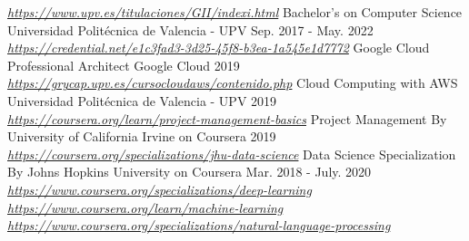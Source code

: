 

\begin{cventries}
  \cvent
    {\href{https://www.upv.es/titulaciones/GII/indexi.html}{\textit{https://www.upv.es/titulaciones/GII/indexi.html}}} %
    {Bachelor's on Computer Science} %
    {Universidad Politécnica de Valencia  - UPV} %
    {Sep. 2017 - May. 2022} %
  \cvent
    {\href{https://credential.net/e1c3fad3-3d25-45f8-b3ea-1a545e1d7772}{\textit{https://credential.net/e1c3fad3-3d25-45f8-b3ea-1a545e1d7772}}} %
    {Google Cloud Professional Architect} %
    {Google Cloud} %
    {2019} %
  \cvent
    {\href{https://grycap.upv.es/cursocloudaws/contenido.php}{\textit{https://grycap.upv.es/cursocloudaws/contenido.php}}} %
    {Cloud Computing with AWS} %
    {Universidad Politécnica de Valencia  - UPV} %
    {2019} %
  \cvent
    {\href{https://coursera.org/learn/project-management-basics}{\textit{https://coursera.org/learn/project-management-basics}}} %
    {Project Management} %
    {By University of California Irvine on Coursera} %
    {2019} %
  \cvent
    {\href{https://coursera.org/specializations/jhu-data-science}{\textit{https://coursera.org/specializations/jhu-data-science}}} %
    {Data Science Specialization} %
    {By Johns Hopkins University on Coursera} %
    {Mar. 2018 - July. 2020} %
  \cvent
    {\href{https://www.coursera.org/specializations/deep-learning}{\textit{https://www.coursera.org/specializations/deep-learning}}
    \href{https://www.coursera.org/learn/machine-learning}{\textit{https://www.coursera.org/learn/machine-learning}}
    \href{https://www.coursera.org/specializations/natural-language-processing}{\textit{https://www.coursera.org/specializations/natural-language-processing}}} %

\end{cventries}
